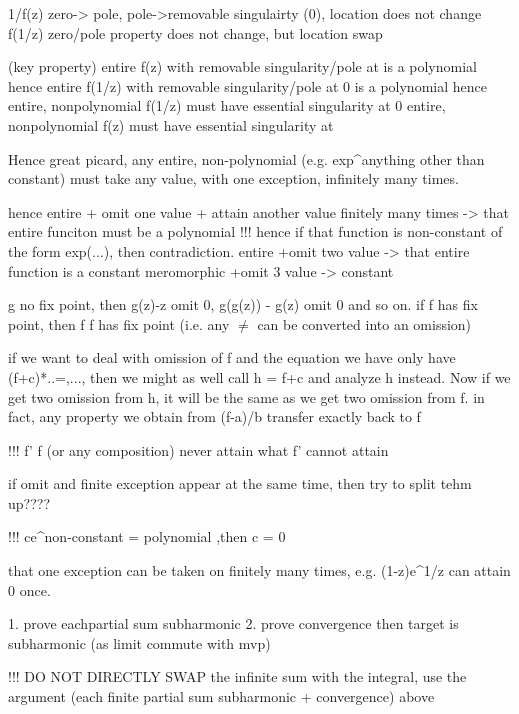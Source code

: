 1/f(z) zero-> pole, pole->removable singulairty (0), location does not change
f(1/z) zero/pole property does not change, but location swap

(key property) entire f(z) with removable singularity/pole at \infty is a polynomial
hence entire f(1/z) with removable singularity/pole at 0 is a polynomial
hence entire, nonpolynomial f(1/z) must have essential singularity at 0
entire, nonpolynomial f(z) must have essential singularity at \infty

Hence great picard, any entire, non-polynomial (e.g. exp^{anything other than constant}) must take any value, with one exception, infinitely many times.

hence entire + omit one value + attain another value finitely many times -> that entire funciton must be a polynomial
	!!! hence if that function is non-constant of the form exp(...), then contradiction.
entire +omit two value -> that entire function is a constant
meromorphic +omit 3 value -> constant

g no fix point, then g(z)-z omit 0, g(g(z)) - g(z) omit 0 and so on.
if f has fix point, then f \circ f has fix point
(i.e. any $\neq$ can be converted into an omission)

if we want to deal with omission of f and the equation we have only have (f+c)*..=,..., then we might as well call h = f+c and analyze h instead. Now if we get two omission from h, it will be the same as we get two omission from f.
in fact, any property we obtain from (f-a)/b transfer exactly back to f

!!! f' \circ f (or any composition) never attain what f' cannot attain











if omit and finite exception appear at the same time, then try to split tehm up????

!!! ce^{non-constant} = polynomial ,then c = 0

that one exception can be taken on finitely many times, e.g. (1-z)e^{1/z} can attain 0 once.


1. prove eachpartial sum subharmonic
2. prove convergence
then target is subharmonic (as limit commute with mvp)

!!! DO NOT DIRECTLY SWAP the infinite sum with the integral, use the argument (each finite partial sum subharmonic + convergence) above

